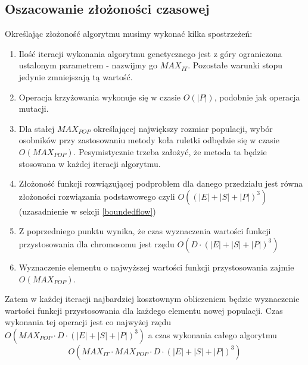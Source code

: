\documentclass[12pt,a4paper]{article}
\theoremstyle{definition}
\begin{document}
\subsection{Oszacowanie złożoności czasowej} \label{complexity}
Określając złożoność algorytmu musimy wykonać kilka spostrzeżeń:
\begin{enumerate}
	\item Ilość iteracji wykonania algorytmu genetycznego jest z góry ograniczona ustalonym parametrem - nazwijmy go $MAX_{IT}$. Pozostałe warunki stopu jedynie zmniejszają tą wartość.
	\item Operacja krzyżowania wykonuje się w czasie $O(|P|)$, podobnie jak operacja mutacji.
	\item Dla stałej $MAX_{POP}$ określającej największy rozmiar populacji, wybór osobników przy zastosowaniu metody koła ruletki odbędzie się w czasie $O(MAX_{POP})$. Pesymistycznie trzeba założyć, że metoda ta będzie stosowana w każdej iteracji algorytmu.
	\item Złożoność funkcji rozwiązującej podproblem dla danego przedziału jest równa złożoności rozwiązania podstawowego czyli $O((|E| + |S| + |P|)^3)$ (uzasadnienie w sekcji \ref{boundedflow})
	\item Z poprzedniego punktu wynika, że czas wyznaczenia wartości funkcji przystosowania dla chromosomu jest rzędu $O(D \cdot (|E| + |S| + |P|)^3)$
	\item Wyznaczenie elementu o najwyższej wartości funkcji przystosowania zajmie \\$O(MAX_{POP})$.
\end{enumerate}
Zatem w każdej iteracji najbardziej kosztownym obliczeniem będzie wyznaczenie wartości funkcji przystosowania dla każdego elementu nowej populacji. Czas wykonania tej operacji jest co najwyżej rzędu $O(MAX_{POP} \cdot D \cdot (|E| + |S| + |P|)^3)$ a czas wykonania całego algorytmu
$$O(MAX_{IT} \cdot MAX_{POP} \cdot D \cdot (|E| + |S| + |P|)^3)$$
\end{document}

